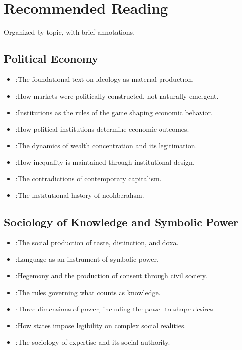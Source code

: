 \chapter{Recommended Reading}
\label{app:reading}

Organized by topic, with brief annotations.

\section*{Political Economy}

\begin{itemize}[nosep]
  \item \textcite{marx1846}:The foundational text on ideology as material production.
  \item \textcite{polanyi1944}:How markets were politically constructed, not naturally emergent.
  \item \textcite{north1990}:Institutions as the rules of the game shaping economic behavior.
  \item \textcite{acemoglu2012}:How political institutions determine economic outcomes.
  \item \textcite{piketty2014}:The dynamics of wealth concentration and its legitimation.
  \item \textcite{stiglitz2012}:How inequality is maintained through institutional design.
  \item \textcite{streeck2016}:The contradictions of contemporary capitalism.
  \item \textcite{harvey2005}:The institutional history of neoliberalism.
\end{itemize}

\section*{Sociology of Knowledge and Symbolic Power}

\begin{itemize}[nosep]
  \item \textcite{bourdieu1984}:The social production of taste, distinction, and doxa.
  \item \textcite{bourdieu1991}:Language as an instrument of symbolic power.
  \item \textcite{gramsci1971}:Hegemony and the production of consent through civil society.
  \item \textcite{foucault1971}:The rules governing what counts as knowledge.
  \item \textcite{lukes2005}:Three dimensions of power, including the power to shape desires.
  \item \textcite{scott1998}:How states impose legibility on complex social realities.
  \item \textcite{eyal2019}:The sociology of expertise and its social authority.
\end{itemize}

